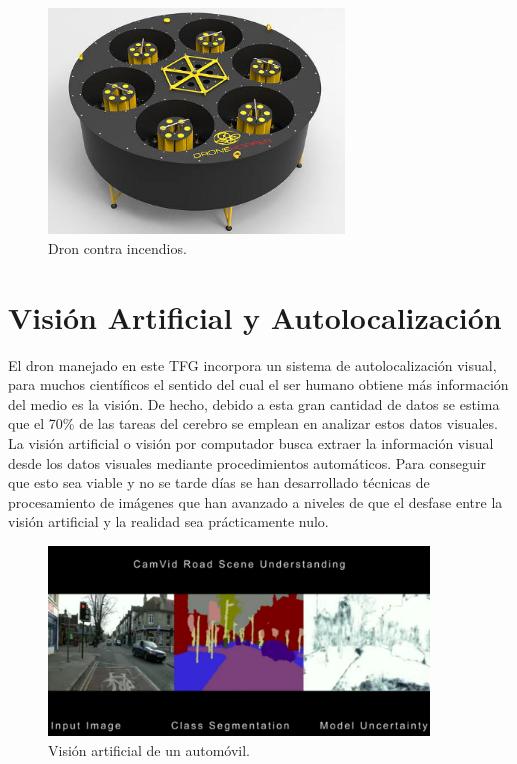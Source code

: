 \begin{figure}[H]
	\begin{center}
		\includegraphics[width=0.7\textwidth]{imag/IMG7.jpeg}
				\caption{Dron contra incendios.} 
	\label{fig:Dron Hopper.}	
	\end{center}
\end{figure}


\section{Visión Artificial y Autolocalización}
\hspace{1cm}  El dron manejado en este TFG incorpora un sistema de autolocalización visual, para muchos científicos el sentido del cual el ser humano obtiene más información del medio es la visión. De hecho, debido a esta gran cantidad de datos se estima que el 70\% de las tareas del cerebro se emplean en analizar estos datos visuales. La visión artificial o visión por computador busca extraer la información visual desde los datos visuales mediante procedimientos automáticos. Para conseguir que esto sea viable y no se tarde días se han desarrollado técnicas de procesamiento de imágenes que han avanzado a niveles de que el desfase entre la visión artificial y la realidad sea prácticamente nulo.

\begin{figure}[H]
	\begin{center}
		\includegraphics[width=0.9\textwidth]{imag/IMG4.png}
				\caption{Visión artificial de un automóvil.}
	\label{fig:Vista artificial automoviles.}	
	\end{center}
\end{figure}

